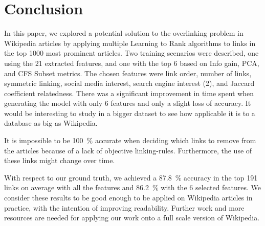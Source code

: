 \section{Conclusion}
In this paper, we explored a potential solution to the overlinking problem in Wikipedia articles by applying multiple Learning to Rank algorithms to links in the top 1000 most prominent articles. Two training scenarios were described, one using the 21 extracted features, and one with the top 6 based on Info gain, PCA, and CFS Subset metrics. The chosen features were link order, number of links, symmetric linking, social media interest, search engine interest (2), and Jaccard coefficient relatedness. There was a significant improvement in time spent when generating the model with only 6 features and only a slight loss of accuracy. It would be interesting to study in a bigger dataset to see how applicable it is to a database as big as Wikipedia.

It is impossible to be 100~\% accurate when deciding which links to remove from the articles because of a lack of objective linking-rules. Furthermore, the use of these links might change over time.

With respect to our ground truth, we achieved a 87.8~\% accuracy in the top 191 links on average with all the features and 86.2~\% with the 6 selected features. We consider these results to be good enough to be applied on Wikipedia articles in practice, with the intention of improving readability. Further work and more resources are needed for applying our work onto a full scale version of Wikipedia. 
%
%
%
%
%
%

